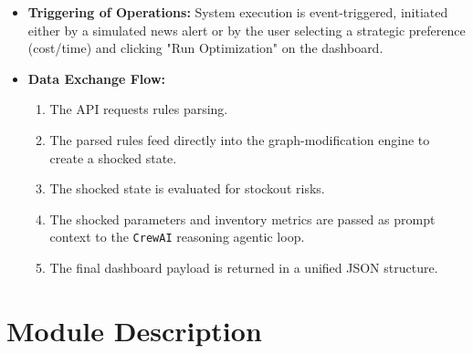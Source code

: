 \begin{itemize}
    \item \textbf{Triggering of Operations:} System execution is event-triggered, initiated either by a simulated news alert or by the user selecting a strategic preference (cost/time) and clicking "Run Optimization" on the dashboard.
    \item \textbf{Data Exchange Flow:}
    \begin{enumerate}
        \item The API requests rules parsing.
        \item The parsed rules feed directly into the graph-modification engine to create a shocked state.
        \item The shocked state is evaluated for stockout risks.
        \item The shocked parameters and inventory metrics are passed as prompt context to the \texttt{CrewAI} reasoning agentic loop.
        \item The final dashboard payload is returned in a unified JSON structure.
    \end{enumerate}
\end{itemize}

\section[Module Description]{Module Description}

